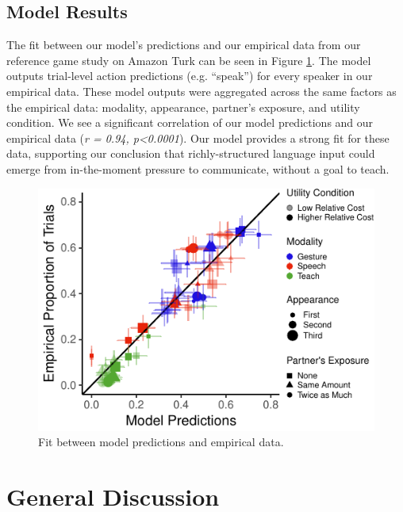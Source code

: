 \documentclass[10pt, letterpaper]{article}
\newenvironment{CodeChunk}{}{}
\begin{document}
\subsection{Model Results}\label{model-results}

The fit between our model's predictions and our empirical data from our
reference game study on Amazon Turk can be seen in Figure
\ref{fig:model_fit}. The model outputs trial-level action predictions
(e.g. ``speak'') for every speaker in our empirical data. These model
outputs were aggregated across the same factors as the empirical data:
modality, appearance, partner's exposure, and utility condition. We see
a significant correlation of our model predictions and our empirical
data (\emph{r = 0.94, p\textless{}0.0001}). Our model provides a strong
fit for these data, supporting our conclusion that richly-structured
language input could emerge from in-the-moment pressure to communicate,
without a goal to teach.

\begin{CodeChunk}
\begin{figure}[H]

{\centering \includegraphics{figs/model_fit-1} 

}

\caption[Fit between model predictions and empirical data]{Fit between model predictions and empirical data.}\label{fig:model_fit}
\end{figure}
\end{CodeChunk}

\section{General Discussion}\label{general-discussion}
\end{document}
